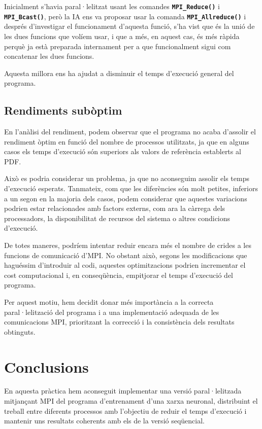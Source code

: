 \documentclass{article}
\begin{document}
Inicialment s'havia paral·lelitzat usant les comandes \texttt{\textbf{MPI\_Reduce()}} i \texttt{\textbf{MPI\_Bcast()}}, però la IA ens va proposar usar la comanda \texttt{\textbf{MPI\_Allreduce()}} i després d'investigar el funcionament d'aquesta funció, s'ha vist que és la unió de les dues funcions que volíem usar, i que a més, en aquest cas, és més ràpida perquè ja està preparada internament per a que funcionalment sigui com concatenar les dues funcions.

Aquesta millora ens ha ajudat a disminuir el temps d'execució general del programa.
\subsection{Rendiments subòptim}

En l'anàlisi del rendiment, podem observar que el programa no acaba d'assolir el rendiment òptim en funció del nombre de processos utilitzats, ja que en alguns casos els temps d'execució són superiors als valors de referència establerts al PDF.

Això es podria considerar un problema, ja que no aconseguim assolir els temps d'execució esperats. Tanmateix, com que les diferències són molt petites, inferiors a un segon en la majoria dels casos, podem considerar que aquestes variacions podrien estar relacionades amb factors externs, com ara la càrrega dels processadors, la disponibilitat de recursos del sistema o altres condicions d'execució.

De totes maneres, podríem intentar reduir encara més el nombre de crides a les funcions de comunicació d'MPI. No obstant això, segons les modificacions que haguéssim d'introduir al codi, aquestes optimitzacions podrien incrementar el cost computacional i, en conseqüència, empitjorar el temps d'execució del programa.

Per aquest motiu, hem decidit donar més importància a la correcta paral·lelització del programa i a una implementació adequada de les comunicacions MPI, prioritzant la correcció i la consistència dels resultats obtinguts.


\newpage

\section{Conclusions}

En aquesta pràctica hem aconseguit implementar una versió paral·lelitzada mitjançant MPI del programa d'entrenament d'una xarxa neuronal, distribuint el treball entre diferents processos amb l'objectiu de reduir el temps d'execució i mantenir uns resultats coherents amb els de la versió seqüencial.
\end{document}
